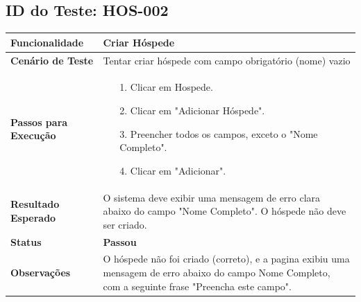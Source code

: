 \documentclass[
	12pt,				%
	openany,			%
	oneside,			%
	a4paper,			%
	english,			%
	french,				%
	spanish,			%
	brazil				%
	]{abntex2}
\begin{document}
\begin{apendicesenv}
	\subsection*{ID do Teste: HOS-002}
	\begin{tabular}{@{} p{5cm} p{11cm} @{}}
		\toprule
		\textbf{Funcionalidade} & Criar Hóspede \\
		\midrule
		\textbf{Cenário de Teste} & Tentar criar hóspede com campo obrigatório (nome) vazio \\
		\midrule
		\textbf{Passos para Execução} &
		\begin{itemize} \itemsep0em 
			\item[1.] Clicar em Hospede.
			\item[2.] Clicar em "Adicionar Hóspede".
			\item[3.] Preencher todos os campos, exceto o "Nome Completo".
			\item[4.] Clicar em "Adicionar".
		\end{itemize} \\
		\midrule
		\textbf{Resultado Esperado} & O sistema deve exibir uma mensagem de erro clara abaixo do campo "Nome Completo". O hóspede não deve ser criado. \\
		\midrule
		\textbf{Status} & \textbf{Passou} \\
		\midrule
		\textbf{Observações} &  O hóspede não foi criado (correto), e a pagina exibiu uma mensagem de erro abaixo do campo Nome Completo, com a seguinte frase "Preencha este campo". \\
		\bottomrule
	\end{tabular}
	\newpage
	

\end{apendicesenv}
\end{document}
